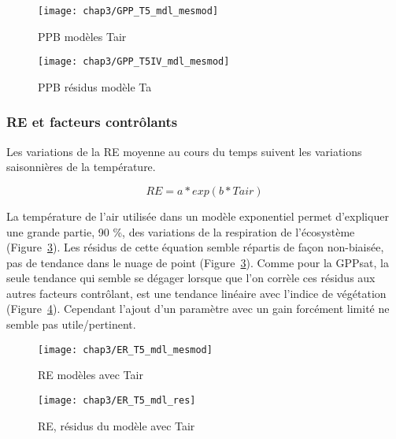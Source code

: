 \begin{figure}
\centering
\texttt{[image: chap3/GPP\_T5\_mdl\_mesmod]}
\caption{PPB modèles Tair}
\label{fig:PPB_T5_mdl}
\end{figure}

\begin{figure}
\centering
\texttt{[image: chap3/GPP\_T5IV\_mdl\_mesmod]}
\caption{PPB résidus modèle Ta}
\label{fig:PPB_T5_res}
\end{figure}

\subsubsection{RE et facteurs contrôlants}

Les variations de la RE moyenne au cours du temps suivent les variations saisonnières de la température.

\begin{equation}
RE = a*exp(b*Tair)
\end{equation}

La température de l'air utilisée dans un modèle exponentiel permet d'expliquer une grande partie, 90 \%, des variations de la respiration de l'écosystème (Figure~\ref{fig:ER_T5_mdl}).
Les résidus de cette équation semble répartis de façon non-biaisée, pas de tendance dans le nuage de point (Figure~\ref{fig:ER_T5_mdl}). 
Comme pour la GPPsat, la seule tendance qui semble se dégager lorsque que l'on corrèle ces résidus aux autres facteurs contrôlant, est une tendance linéaire avec l'indice de végétation (Figure~\ref{fig:ER_T5_res}).
Cependant l'ajout d'un paramètre avec un gain forcément limité ne semble pas utile/pertinent.

\begin{figure}
\centering
\texttt{[image: chap3/ER\_T5\_mdl\_mesmod]}
\caption{RE modèles avec Tair}
\label{fig:ER_T5_mdl}
\end{figure}

\begin{figure}
\centering
\texttt{[image: chap3/ER\_T5\_mdl\_res]}
\caption{RE, résidus du modèle avec Tair}
\label{fig:ER_T5_res}
\end{figure}

